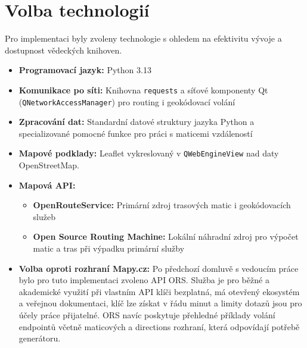 \section{Volba technologií}
Pro implementaci byly zvoleny technologie s ohledem na efektivitu vývoje a dostupnost vědeckých knihoven.

\begin{itemize}
    \item \textbf{Programovací jazyk:} Python 3.13
    \item \textbf{Komunikace po síti:} Knihovna \texttt{requests} a síťové komponenty Qt (\texttt{QNetworkAccessManager}) pro routing i geokódovací volání
    \item \textbf{Zpracování dat:} Standardní datové struktury jazyka Python a specializované pomocné funkce pro práci s maticemi vzdáleností
    \item \textbf{Mapové podklady:} Leaflet vykreslovaný v \texttt{QWebEngineView} nad daty OpenStreetMap.
    \item \textbf{Mapová API:}
    \begin{itemize}
        \item \textbf{OpenRouteService:} Primární zdroj trasových matic i geokódovacích služeb
        \item \textbf{Open Source Routing Machine:} Lokální náhradní zdroj pro výpočet matic a tras při výpadku primární služby
    \end{itemize}
    \item \textbf{Volba oproti rozhraní Mapy.cz:} Po předchozí domluvě s vedoucím práce bylo pro tuto implementaci zvoleno API ORS. Služba je pro běžné a akademické využití při vlastním API klíči bezplatná, má otevřený ekosystém a veřejnou dokumentaci, klíč lze získat v řádu minut a limity dotazů jsou pro účely práce přijatelné. ORS navíc poskytuje přehledné příklady volání endpointů včetně maticových a directions rozhraní, která odpovídají potřebě generátoru.\cite{ors_matrix_docs}
\end{itemize}
\endinput